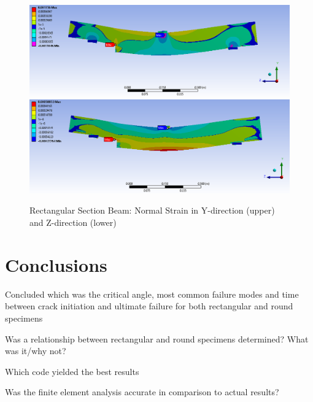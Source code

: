 \documentclass[11pt,a4paper]{article}
\numberwithin{equation}{subsection}
\begin{document}
\begin{figure}[h]
	\begin{center}
		\includegraphics[scale=0.45]{y_normal_strain}
		\includegraphics[scale=0.45]{z_normal_strain}
	\end{center}
	\caption{Rectangular Section Beam: Normal Strain in Y-direction (upper) and Z-direction (lower)}
	\label{fig:fig:y_norm}
\end{figure}
\pagebreak

\section{Conclusions}
\vspace*{\baselineskip}
\noindent Concluded which was the critical angle, most common failure modes and time between crack initiation and ultimate failure for both rectangular and round specimens\par

\vspace*{\baselineskip}
\noindent Was a relationship between rectangular and round specimens determined? What was it/why not?\par

\vspace*{\baselineskip}
\noindent Which code yielded the best results\par

\vspace*{\baselineskip}
\noindent Was the finite element analysis accurate in comparison to actual results?\par
\end{document}
